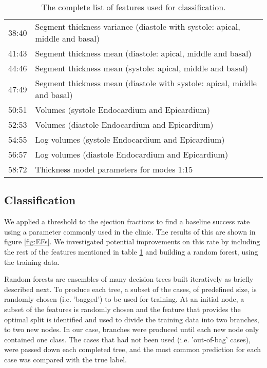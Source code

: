 \documentclass{llncs}
\begin{document}
\begin{table}
\begin{center}
\begin{tabular}{l|l|}
  38:40 & Segment thickness variance (diastole with systole: apical, middle and basal)\\
  \cline{1-2}
  41:43 & Segment thickness mean (diastole: apical, middle and basal)\\
  44:46 & Segment thickness mean (systole: apical, middle and basal)\\
   47:49 & Segment thickness mean (diastole with systole: apical, middle and basal)\\
   \cline{1-2}
   50:51 & Volumes (systole Endocardium and Epicardium) \\
   52:53 & Volumes (diastole Endocardium and Epicardium) \\
   \cline{1-2}
    54:55 & Log volumes (systole Endocardium and Epicardium) \\
   56:57 & Log volumes (diastole Endocardium and Epicardium) \\
    \cline{1-2}
    58:72 & Thickness model parameters for modes 1:15\\

     \cline{1-2}
     \end{tabular}

		\caption{The complete list of features used for classification.}
		\label{table:featurelist}
		\end{center}
		\end{table}
		
	\subsection{Classification}
	\label{method:classification}
	
	
We applied a threshold to the ejection fractions to find a baseline success rate using a parameter commonly used in the clinic. The results of this are shown in figure \ref{fig:EFs}. We investigated potential improvements on this rate by including the rest of the features mentioned in table \ref{table:featurelist} and building a random forest, using the training data.

  Random forests are ensembles of many decision trees built iteratively as briefly described next. To produce each tree, a subset of the cases, of predefined size, is randomly chosen (i.e. 'bagged') to be used for training. At an initial node, a subset of the features is randomly chosen and the feature that provides the optimal split is identified and used to divide the training data into two branches, to two new nodes. In our case, branches were produced until each new node only contained one class. The cases that had not been used (i.e. 'out-of-bag' cases), were passed down each completed tree, and the most common prediction for each case was compared with the true label. 
 
\end{document}
